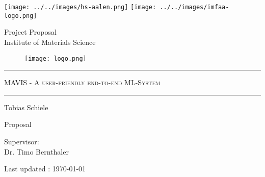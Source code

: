 




\begin{titlepage}
%
    \texttt{[image: ../../images/hs-aalen.png]}
    \hfill
    \texttt{[image: ../../images/imfaa-logo.png]}
    \vskip 2cm
%
    \begin{flushleft}
        \par \color{darkgray} %
        Project Proposal\\%
        Institute of Materials Science
    \end{flushleft}
    \vfill
%
    \begin{center}

        \vspace{0mm}
        \begin{figure}[!h]
            \centering
            \texttt{[image: logo.png]}
        \end{figure}

        \par \rule{\textwidth}{0.2pt}
        \par\Huge\textsc{MAVIS - A user-friendly end-to-end ML-System}%
        \par\rule[1ex]{\textwidth}{0.2pt}
        \par \large \color{black}%
        \large Tobias Schiele %

    \end{center}
    \vfill
%
    \begin{flushright}\begin{minipage}{0.45\linewidth}
        \par\Large \color{black}
        \par\large Proposal\\
        \par\large Supervisor: \\ \large Dr. Timo Bernthaler\\
        \par
    \end{minipage}\end{flushright}
    \vfill
%
    \begin{center}
        \color{black}
        \vspace*{0mm}
        \small  Last updated : \MonthYearFormat\today
    \end{center}
%
\end{titlepage}



